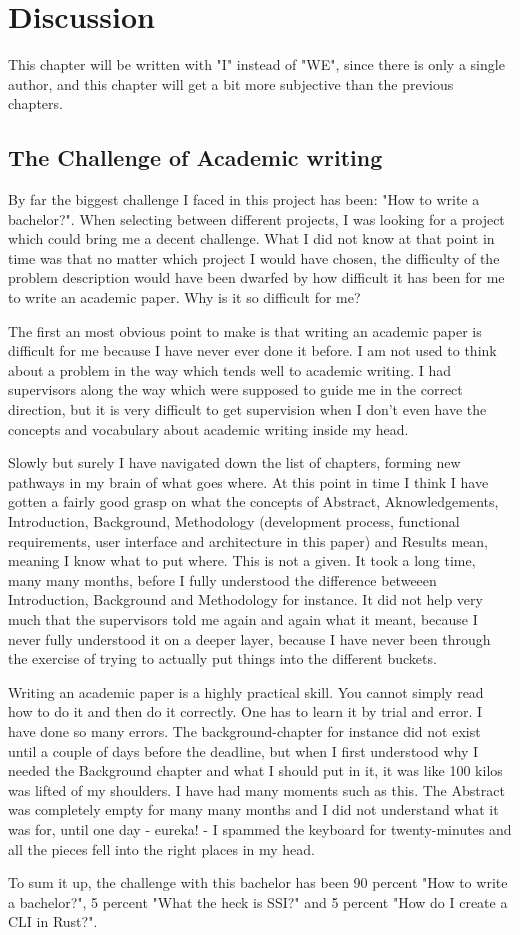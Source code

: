 \hypertarget{discussion}{%
\chapter{Discussion}\label{discussion}}

This chapter will be written with "I" instead of "WE", since there is only a single author, and this chapter will get a bit more subjective than the previous chapters.


\section{The Challenge of Academic writing}

By far the biggest challenge I faced in this project has been: "How to write a bachelor?". When selecting between different projects, I was looking for a project which could bring me a decent challenge. What I did not know at that point in time was that no matter which project I would have chosen, the difficulty of the problem description would have been dwarfed by how difficult it has been for me to write an academic paper. Why is it so difficult for me?

The first an most obvious point to make is that writing an academic paper is difficult for me because I have never ever done it before. I am not used to think about a problem in the way which tends well to academic writing. I had supervisors along the way which were supposed to guide me in the correct direction, but it is very difficult to get supervision when I don't even have the concepts and vocabulary about academic writing inside my head.

Slowly but surely I have navigated down the list of chapters, forming new pathways in my brain of what goes where. At this point in time I think I have gotten a fairly good grasp on what the concepts of Abstract, Aknowledgements, Introduction, Background, Methodology (development process, functional requirements, user interface and architecture in this paper) and Results mean, meaning I know what to put where. This is not a given. It took a long time, many many months, before I fully understood the difference betweeen Introduction, Background and Methodology for instance. It did not help very much that the supervisors told me again and again what it meant, because I never fully understood it on a deeper layer, because I have never been through the exercise of trying to actually put things into the different buckets.

Writing an academic paper is a highly practical skill. You cannot simply read how to do it and then do it correctly. One has to learn it by trial and error. I have done so many errors. The background-chapter for instance did not exist until a couple of days before the deadline, but when I first understood why I needed the Background chapter and what I should put in it, it was like 100 kilos was lifted of my shoulders. I have had many moments such as this. The Abstract was completely empty for many many months and I did not understand what it was for, until one day - eureka! - I spammed the keyboard for twenty-minutes and all the pieces fell into the right places in my head.

To sum it up, the challenge with this bachelor has been 90 percent "How to write a bachelor?", 5 percent "What the heck is SSI?" and 5 percent "How do I create a CLI in Rust?".


